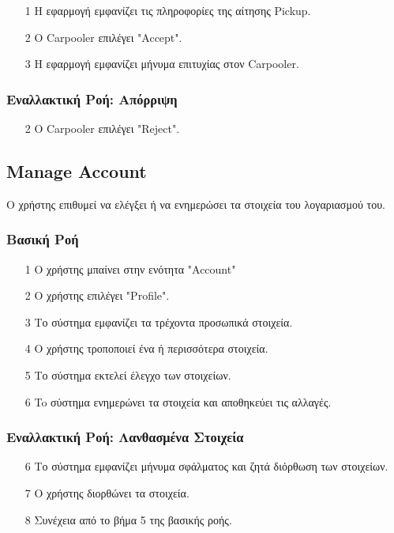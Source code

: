 \begin{enumerate}
    \item[1] Η εφαρμογή εμφανίζει τις πληροφορίες της αίτησης Pickup.
    \item[2] Ο Carpooler επιλέγει "Accept".
    \item[3] Η εφαρμογή εμφανίζει μήνυμα επιτυχίας στον Carpooler.
\end{enumerate}

\subsubsection{Εναλλακτική Ροή: Απόρριψη}

\begin{enumerate}
    \item[2] Ο Carpooler επιλέγει "Reject".
\end{enumerate}

\subsection{Manage Account}
\label{uc:manage-account}

Ο χρήστης επιθυμεί να ελέγξει ή να ενημερώσει τα στοιχεία του λογαριασμού του.

\subsubsection{Βασική Ροή}

\begin{enumerate}
    \item[1] Ο χρήστης μπαίνει στην ενότητα "Account"
    \item[2] O χρήστης επιλέγει "Profile".
    \item[3] Το σύστημα εμφανίζει τα τρέχοντα προσωπικά στοιχεία.
    \item[4] Ο χρήστης τροποποιεί ένα ή περισσότερα στοιχεία.
    \item[5] Το σύστημα εκτελεί έλεγχο των στοιχείων.
    \item[6] To σύστημα ενημερώνει τα στοιχεία και αποθηκεύει τις αλλαγές.
\end{enumerate}

\subsubsection{Εναλλακτική Ροή: Λανθασμένα Στοιχεία}

\begin{enumerate}
    \item[6] Το σύστημα εμφανίζει μήνυμα σφάλματος και ζητά διόρθωση των στοιχείων.
    \item[7] Ο χρήστης διορθώνει τα στοιχεία.
    \item[8] Συνέχεια από το βήμα 5 της βασικής ροής.
\end{enumerate}

